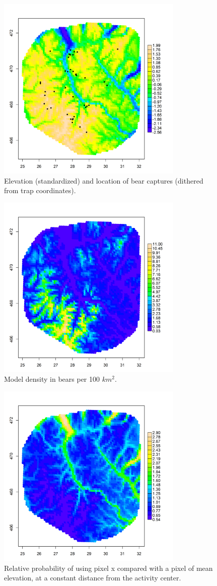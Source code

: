 \documentclass[12pt]{article}
\begin{document}
\begin{figure}
\centering
\includegraphics[width=3.5in,height=3.5in]{figs/elev_captures.png}
\caption{Elevation (standardized) and location of bear captures
  (dithered from trap coordinates).  
}
\label{fig.elevation}
\end{figure}


\begin{figure}
\centering
\includegraphics[width=3.5in,height=3.5in]{figs/density.png}
\caption{Model density in bears per 100 $km^2$.
}
\label{fig.density}
\end{figure}


\begin{figure}
\centering
\includegraphics[width=3.5in,height=3.5in]{figs/spaceusage.png}
\caption{Relative probability of using pixel x compared with a pixel
  of mean elevation, at a constant distance from the activity center. 
}
\label{fig.spaceusage}
\end{figure}





\clearpage
\newpage
\end{document}
